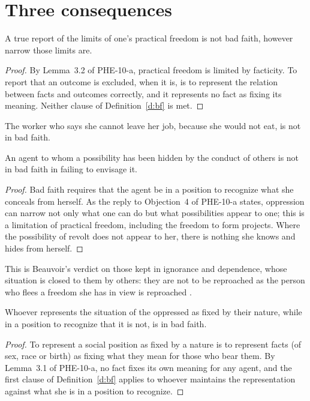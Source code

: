 \documentclass{situationist-preprint}
\begin{document}
\section{Three consequences}

\begin{proposition}\label{p:report}
A true report of the limits of one's practical freedom is not bad faith, however narrow those limits are.
\end{proposition}

\begin{proof}
By Lemma~3.2 of PHE-10-a, practical freedom is limited by facticity. To report that an outcome is excluded, when it is, is to represent the relation between facts and outcomes correctly, and it represents no fact as fixing its meaning. Neither clause of Definition~\ref{d:bf} is met.
\end{proof}

The worker who says she cannot leave her job, because she would not eat, is not in bad faith.

\begin{proposition}\label{p:hidden}
An agent to whom a possibility has been hidden by the conduct of others is not in bad faith in failing to envisage it.
\end{proposition}

\begin{proof}
Bad faith requires that the agent be in a position to recognize what she conceals from herself. As the reply to Objection~4 of PHE-10-a states, oppression can narrow not only what one can do but what possibilities appear to one; this is a limitation of practical freedom, including the freedom to form projects. Where the possibility of revolt does not appear to her, there is nothing she knows and hides from herself.
\end{proof}

This is Beauvoir's verdict on those kept in ignorance and dependence, whose situation is closed to them by others: they are not to be reproached as the person who flees a freedom she has in view is reproached \citep{Beauvoir1947}.

\begin{proposition}\label{p:oppressor}
Whoever represents the situation of the oppressed as fixed by their nature, while in a position to recognize that it is not, is in bad faith.
\end{proposition}

\begin{proof}
To represent a social position as fixed by a nature is to represent facts (of sex, race or birth) as fixing what they mean for those who bear them. By Lemma~3.1 of PHE-10-a, no fact fixes its own meaning for any agent, and the first clause of Definition~\ref{d:bf} applies to whoever maintains the representation against what she is in a position to recognize.
\end{proof}
\end{document}
